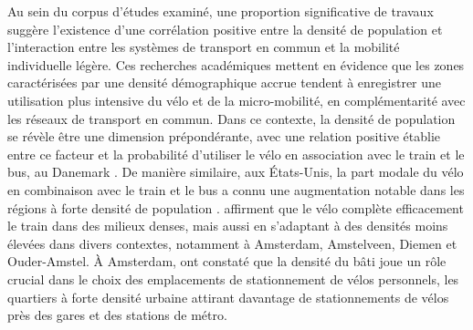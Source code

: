 \begin{refsegment}
Au sein du corpus d'études examiné, une proportion significative de travaux suggère l'existence d'une corrélation positive entre la densité de population et l'interaction entre les systèmes de transport en commun et la mobilité individuelle légère. Ces recherches académiques mettent en évidence que les zones caractérisées par une densité démographique accrue tendent à enregistrer une utilisation plus intensive du vélo et de la micro-mobilité, en complémentarité avec les réseaux de transport en commun. Dans ce contexte, la densité de population se révèle être une dimension prépondérante, avec une relation positive établie entre ce facteur et la probabilité d'utiliser le vélo en association avec le train et le bus, au Danemark \textcolor{blue}{\autocite[41]{nielsen_bikeability_2018}}. De manière similaire, aux États-Unis, la part modale du vélo en combinaison avec le train et le bus a connu une augmentation notable dans les régions à forte densité de population \textcolor{blue}{\autocite[107]{wang_bicycle-transit_2013}}. \textcolor{blue}{\textcite[212]{kager_characterisation_2016}} affirment que le vélo complète efficacement le train dans des milieux denses, mais aussi en s'adaptant à des densités moins élevées dans divers contextes, notamment à Amsterdam, Amstelveen, Diemen et Ouder-Amstel. À Amsterdam, \textcolor{blue}{\textcite[344]{kampen_bicycle_2021}} ont constaté que la densité du bâti joue un rôle crucial dans le choix des emplacements de stationnement de vélos personnels, les quartiers à forte densité urbaine attirant davantage de stationnements de vélos près des gares et des stations de métro.%


\end{refsegment}
